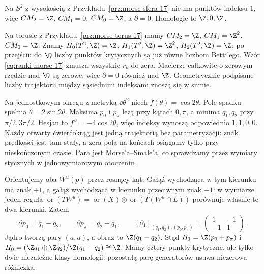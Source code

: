 \begin{przyklad}
Na $S^2$ z wysokością
z Przykładu~\ref{prz:morse-sfera-17}
nie ma punktów indeksu $1$,
więc
$CM_2=\Z$, $CM_1=0$,
$CM_0=\Z$, a $\partial=0$.
Homologie to $\Z,0,\Z$.

Na torusie z
Przykładu~\ref{prz:morse-torus-17}
mamy
$CM_2=\Z$, $CM_1=\Z^2$,
$CM_0=\Z$. Znamy
$H_0(T^2;\Z)=\Z$,
$H_1(T^2;\Z)=\Z^2$,
$H_2(T^2;\Z)=\Z$;
po przejściu do $\Q$
liczby punktów krytycznych
są już równe liczbom
Betti'ego. Wzór
\eqref{eq:ranki-morse-17}
zmusza wszystkie
$r_k$ do zera.
Macierze całkowite
o zerowym rzędzie
nad $\Q$ są zerowe,
więc $\partial=0$
również nad $\Z$.
Geometrycznie podpisane
liczby trajektorii między
sąsiednimi indeksami
znoszą się w sumie.
\end{przyklad}

\begin{przyklad}
\label{prz:morse-okrag-znaki-22}
Na jednostkowym okręgu z metryką $\dd\theta^2$ niech
$f(\theta)=\cos2\theta$. Pole spadku spełnia
$\dot\theta=2\sin2\theta$.
Maksima $p_0$ i $p_\pi$ leżą przy kątach $0,\pi$,
a minima $q_1,q_2$ przy $\pi/2,3\pi/2$.
Hesjan to $f''=-4\cos2\theta$,
więc indeksy wynoszą odpowiednio $1,1,0,0$.
Każdy otwarty ćwierćokrąg jest jedną trajektorią bez parametryzacji:
znak prędkości jest tam stały, a zera pola na końcach
osiągamy tylko przy nieskończonym czasie.
Para jest Morse'a--Smale'a, co sprawdzamy przez wymiary
stycznych w jednowymiarowym otoczeniu.

Orientujemy oba $W^u(p)$ przez rosnący kąt.
Gałąź wychodząca w tym kierunku ma znak $+1$,
a gałąź wychodząca w kierunku przeciwnym znak $-1$:
w wymiarze jeden reguła
$\operatorname{or}(TW^u)=\operatorname{or}(X)\otimes
\operatorname{or}(T(W^u\cap L))$
porównuje właśnie te dwa kierunki.
Zatem
\[
 \partial p_0=q_1-q_2,\qquad
 \partial p_\pi=q_2-q_1,\qquad
 [\partial_1]_{(q_1,q_2),(p_0,p_\pi)}
 =\begin{pmatrix}1&-1\\-1&1\end{pmatrix}.
\]
Jądro tworzą pary $(a,a)$, a obraz to $\Z(q_1-q_2)$.
Stąd $H_1=\Z(p_0+p_\pi)$ i
$H_0=(\Z q_1\oplus\Z q_2)/\Z(q_1-q_2)\cong\Z$.
Mamy cztery punkty krytyczne, ale tylko dwie niezależne
klasy homologii: pozostałą parę generatorów usuwa niezerowa różniczka.
\end{przyklad}

